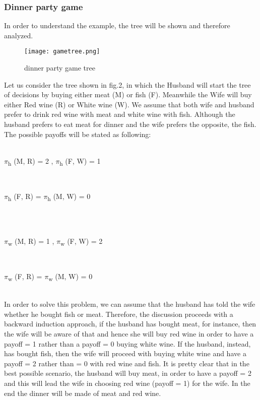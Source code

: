 \documentclass[conference]{IEEEtran}
\begin{document}
\subsubsection{Dinner party game}
In order to understand the example, the tree will be shown and therefore analyzed.
\begin{figure}[h]
    \centerline{\texttt{[image: gametree.png]}}
    \caption{dinner party game tree}
    \label{gametree}
\end{figure}

Let us consider the tree shown in fig.2, in which the Husband will start the tree of decisions by buying either meat (M) or fish (F). Meanwhile the Wife will buy either Red wine (R) or White wine (W). We assume that both wife and husband prefer to drink red wine with meat and white wine with fish. Although the husband prefers to eat meat for dinner and the wife prefers the opposite, the fish. The possible payoffs will be stated as following:\\ \\
\centerline{$\pi$\textsubscript{h} (M, R) = 2 ,  $\pi$\textsubscript{h} (F, W) = 1} \\
\centerline{$\pi$\textsubscript{h} (F, R) = $\pi$\textsubscript{h} (M, W) = 0} \\\\
\centerline{$\pi$\textsubscript{w} (M, R) = 1 ,  $\pi$\textsubscript{w} (F, W) = 2} \\
\centerline{$\pi$\textsubscript{w} (F, R) = $\pi$\textsubscript{w} (M, W) = 0}
\\

In order to solve this problem, we can assume that the husband has told the wife whether he bought fish or meat. Therefore, the discussion proceeds with a backward induction approach, if the husband has bought meat, for instance, then the wife will be aware of that and hence she will buy red wine in order to have a payoff = 1 rather than a payoff = 0 buying white wine. If the husband, instead, has bought fish, then the wife will proceed with buying white wine and have a payoff = 2 rather than = 0 with red wine and fish.
It is pretty clear that in the best possible scenario, the husband will buy meat, in order to have a payoff = 2 and this will lead the wife in choosing red wine (payoff = 1) for the wife. In the end the dinner will be made of meat and red wine.\cite{b7}
\end{document}
